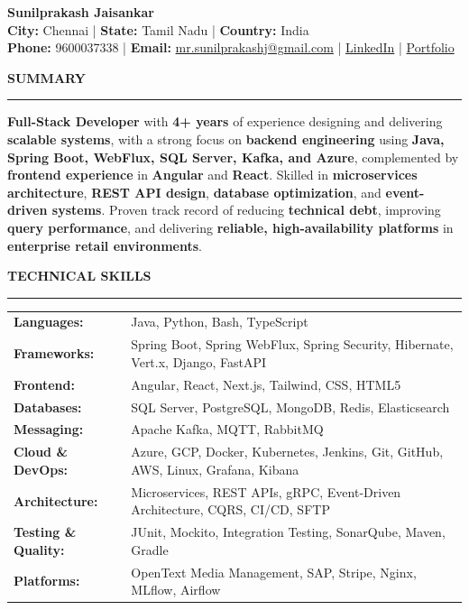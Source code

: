 \documentclass[9pt,letterpaper]{article}
\newlength{\sectionrulegap}
\newlength{\sectioncontentgap}
\newcommand{\resumesection}[1]{%
  \par\vspace{\sectionrulegap}%
  \noindent\textbf{\MakeUppercase{#1}}\par
  \nointerlineskip
  \vspace{\sectionrulegap}%
  \noindent\rule{\linewidth}{0.35pt}\par
  \nointerlineskip
  \vspace{\sectionrulegap}%
}
\newcommand{\sep}{ | }
\begin{document}
\begin{center}
{\LARGE\textbf{Sunilprakash Jaisankar}}\\[3.5pt]
{\small \textbf{City:} Chennai \sep \textbf{State:} Tamil Nadu \sep \textbf{Country:} India}\\
{\small \textbf{Phone:} 9600037338 \sep \textbf{Email:} \href{mailto:mr.sunilprakashj@gmail.com}{mr.sunilprakashj@gmail.com} \sep \href{https://www.linkedin.com/in/sunilprakash-jaisankar/}{LinkedIn} \sep \href{https://portfolio-mu-kohl-yjbcqzs4dn.vercel.app/}{Portfolio}}
\end{center}
\vspace{-10pt}

\resumesection{Summary}
\textbf{Full-Stack Developer} with \textbf{4+ years} of experience designing and delivering \textbf{scalable systems}, with a strong focus on \textbf{backend engineering} using \textbf{Java, Spring Boot, WebFlux, SQL Server, Kafka, and Azure}, complemented by \textbf{frontend experience} in \textbf{Angular} and \textbf{React}. Skilled in \textbf{microservices architecture}, \textbf{REST API design}, \textbf{database optimization}, and \textbf{event-driven systems}. Proven track record of reducing \textbf{technical debt}, improving \textbf{query performance}, and delivering \textbf{reliable, high-availability platforms} in \textbf{enterprise retail environments}.
\vspace{\sectioncontentgap}

\resumesection{Technical Skills}
\noindent
\begin{tabularx}{\linewidth}{@{}>{\raggedright\arraybackslash}p{3.6cm} X@{}}
\textbf{Languages:} & Java, Python, Bash, TypeScript \\
\textbf{Frameworks:} & Spring Boot, Spring WebFlux, Spring Security, Hibernate, Vert.x, Django, FastAPI \\
\textbf{Frontend:} & Angular, React, Next.js, Tailwind, CSS, HTML5 \\
\textbf{Databases:} & SQL Server, PostgreSQL, MongoDB, Redis, Elasticsearch \\
\textbf{Messaging:} & Apache Kafka, MQTT, RabbitMQ \\
\textbf{Cloud \& DevOps:} & Azure, GCP, Docker, Kubernetes, Jenkins, Git, GitHub, AWS, Linux, Grafana, Kibana \\
\textbf{Architecture:} & Microservices, REST APIs, gRPC, Event-Driven Architecture, CQRS, CI/CD, SFTP \\
\textbf{Testing \& Quality:} & JUnit, Mockito, Integration Testing, SonarQube, Maven, Gradle \\
\textbf{Platforms:} & OpenText Media Management, SAP, Stripe, Nginx, MLflow, Airflow
\end{tabularx}
\vspace{\sectioncontentgap}
\end{document}
